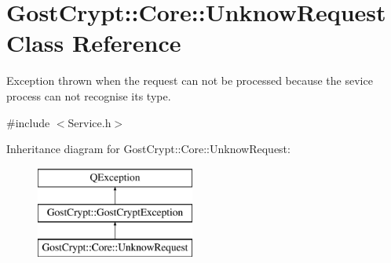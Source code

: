 \hypertarget{class_gost_crypt_1_1_core_1_1_unknow_request}{}\section{Gost\+Crypt\+:\+:Core\+:\+:Unknow\+Request Class Reference}
\label{class_gost_crypt_1_1_core_1_1_unknow_request}


Exception thrown when the request can not be processed because the sevice process can not recognise its type.  




{\ttfamily \#include $<$Service.\+h$>$}

Inheritance diagram for Gost\+Crypt\+:\+:Core\+:\+:Unknow\+Request\+:\begin{figure}[H]
\begin{center}
\leavevmode
\includegraphics[height=3.000000cm]{class_gost_crypt_1_1_core_1_1_unknow_request}
\end{center}
\end{figure}
